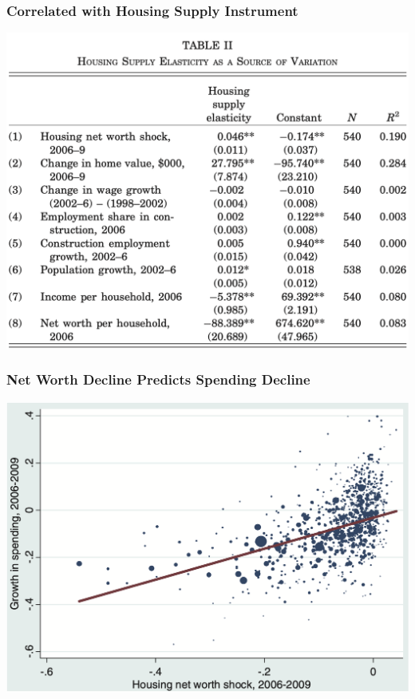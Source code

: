 \documentclass[english,xcolor=svgnames]{beamer}
\begin{document}
\begin{frame}
\frametitle[alignment=center]{Correlated with Housing Supply Instrument}
\centering
\includegraphics[scale=0.4]{figures/MRSTAB2.png}
\end{frame}

\begin{frame}
\frametitle[alignment=center]{Net Worth Decline Predicts Spending Decline}
\centering
\includegraphics[scale=0.4]{figures/MRSFIG3.png}
\end{frame}
\end{document}
